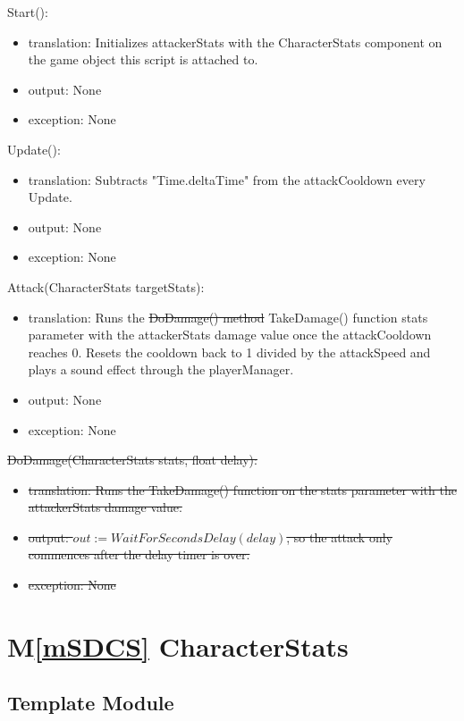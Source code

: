 \documentclass[12pt]{article}
\newcommand{\mref}[1]{M\ref{#1}}
\begin{document}
\noindent Start():
\begin{itemize}
\item translation: Initializes attackerStats with the CharacterStats component on the game object this script is attached to.
\item output: None
\item exception: None
\end{itemize}

\noindent Update():
\begin{itemize}
\item translation: Subtracts "Time.deltaTime" from the attackCooldown every Update.
\item output: None
\item exception: None
\end{itemize}

\noindent Attack(CharacterStats targetStats):
\begin{itemize}
\item translation: Runs the \sout{DoDamage() method} {\color{magenta} TakeDamage() function stats parameter with the attackerStats damage value} once the attackCooldown reaches 0. Resets the cooldown back to 1 divided by the attackSpeed {\color{magenta} and plays a sound effect through the playerManager}.
\item output: None
\item exception: None
\end{itemize}

\noindent \sout{DoDamage(CharacterStats stats, float delay):}
\begin{itemize}
\item \sout{translation: Runs the TakeDamage() function on the stats parameter with the attackerStats damage value.}
\item \sout{output: $out := WaitForSecondsDelay(delay)$, so the attack only commences after the delay timer is over.}
\item \sout{exception: None}
\end{itemize}
\newpage

\section* {\mref{mSDCS} CharacterStats}

\subsection*{Template Module}
\end{document}
